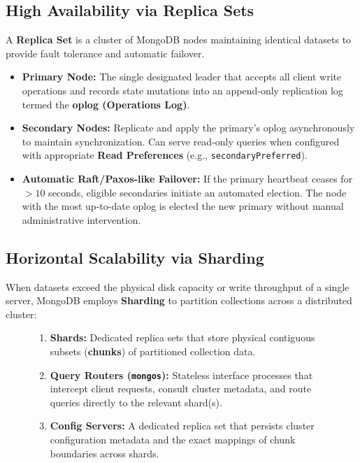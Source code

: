 \subsection{High Availability via Replica Sets}
A \textbf{Replica Set} is a cluster of MongoDB nodes maintaining identical datasets to provide fault tolerance and automatic failover.
\begin{itemize}
    \item \textbf{Primary Node:} The single designated leader that accepts all client write operations and records state mutations into an append-only replication log termed the \textbf{oplog (Operations Log)}.
    \item \textbf{Secondary Nodes:} Replicate and apply the primary's oplog asynchronously to maintain synchronization. Can serve read-only queries when configured with appropriate \textbf{Read Preferences} (e.g., \texttt{secondaryPreferred}).
    \item \textbf{Automatic Raft/Paxos-like Failover:} If the primary heartbeat ceases for $> 10$ seconds, eligible secondaries initiate an automated election. The node with the most up-to-date oplog is elected the new primary without manual administrative intervention.
\end{itemize}

\subsection{Horizontal Scalability via Sharding}
When datasets exceed the physical disk capacity or write throughput of a single server, MongoDB employs \textbf{Sharding} to partition collections across a distributed cluster:

\begin{figure}[htbp]
\centering
\begin{tcolorbox}[colback=codebg, colframe=primary, title=\textbf{The Three Core Components of a Sharded Cluster}]
\begin{enumerate}
    \item \textbf{Shards:} Dedicated replica sets that store physical contiguous subsets (\textbf{chunks}) of partitioned collection data.
    \item \textbf{Query Routers (\texttt{mongos}):} Stateless interface processes that intercept client requests, consult cluster metadata, and route queries directly to the relevant shard(s).
    \item \textbf{Config Servers:} A dedicated replica set that persists cluster configuration metadata and the exact mappings of chunk boundaries across shards.
\end{enumerate}
\end{tcolorbox}
\end{figure}

